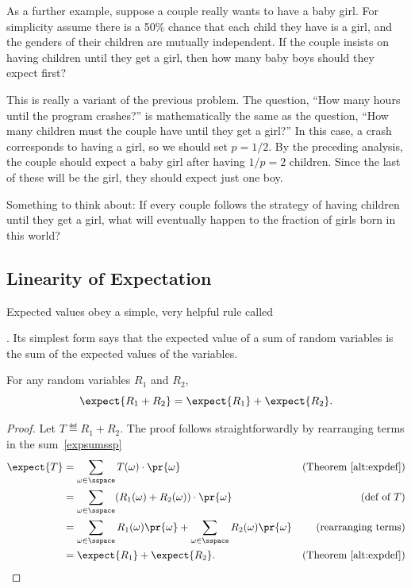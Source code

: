 As a further example, suppose a couple really wants to have a baby girl.
For simplicity assume there is a 50\% chance that each child they have is a
girl, and the genders of their children are mutually independent.  If the
couple insists on having children until they get a girl, then how many
baby boys should they expect first?

This is really a variant of the previous problem.  The question, ``How
many hours until the program crashes?'' is mathematically the same as
the question, ``How many children must the couple have until they get
a girl?''  In this case, a crash corresponds to having a girl, so we
should set $p = 1/2$.  By the preceding analysis, the couple
should expect a baby girl after having $1/p = 2$ children.  Since the
last of these will be the girl, they should expect just one boy.

Something to think about: If every couple follows the strategy of having
children until they get a girl, what will eventually happen to the
fraction of girls born in this world?

\subsection{Linearity of Expectation}\label{finlin}

Expected values obey a simple, very helpful rule called
.  Its simplest
form says that the expected value of a sum of random variables is the sum
of the expected values of the variables.

\begin{theorem}\label{expsum-2}
For any random variables $R_1$ and $R_2$,
\[
\expect{R_1 + R_2} = \expect{R_1} + \expect{R_2}.
\]
\end{theorem}

\begin{proof}
Let $T \eqdef R_1+R_2$.  The proof follows straightforwardly by
rearranging terms in the sum~\eqref{expsumssp}
\begin{align*}
\expect{T} & = \sum_{\omega \in \sspace} T(\omega) \cdot \pr{\omega}
                & \text{(Theorem~\ref{alt:expdef})}\\
        & = \sum_{\omega \in \sspace} (R_1(\omega) + R_2(\omega)) \cdot \pr{\omega}
                         & \text{(def of $T$)}\\
        & = \sum_{\omega \in \sspace} R_1(\omega) \pr{\omega} + 
              \sum_{\omega \in \sspace} R_2(\omega) \pr{\omega} & \text{(rearranging terms)}\\
        & = \expect{R_1} + \expect{R_2}.   & \text{(Theorem~\ref{alt:expdef})}
\end{align*}
\end{proof}

